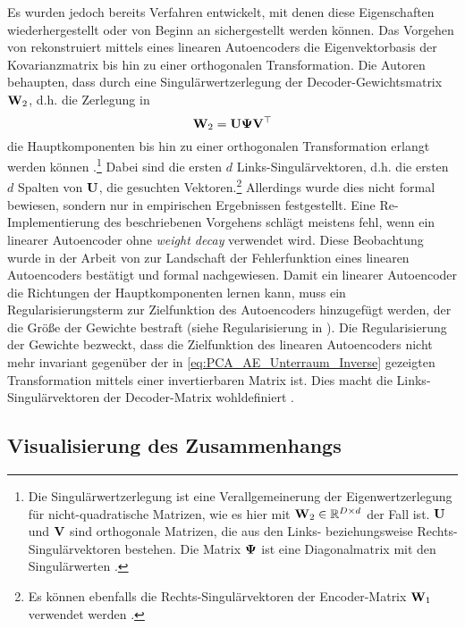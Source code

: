 Es wurden jedoch bereits Verfahren entwickelt, mit denen diese Eigenschaften wiederhergestellt oder
von Beginn an sichergestellt werden können. Das Vorgehen von \textcite{Plaut.2018} rekonstruiert
mittels eines linearen Autoencoders die Eigenvektorbasis der Kovarianzmatrix bis hin zu einer
orthogonalen Transformation. Die Autoren behaupten, dass durch eine Singulärwertzerlegung der
Decoder-Gewichtsmatrix $\mathbf{W}_2$, d.h. die Zerlegung in
\begin{equation}
	\label{eq:SVD}
	\mathbf{W}_2 = \mathbf{U} \mathbf{\Psi} \mathbf{V}^\top
\end{equation}
die Hauptkomponenten bis hin zu einer orthogonalen Transformation erlangt werden können \parencite[4]{Plaut.2018}.\footnote{Die Singulärwertzerlegung ist eine Verallgemeinerung der
	Eigenwertzerlegung für nicht-quadratische Matrizen, wie es hier mit $\mathbf{W}_2 \in \mathbb{R}^{D \times
			d}$ der Fall ist. $\mathbf{U}$ und $\mathbf{V}$ sind orthogonale Matrizen, die aus den Links-
	beziehungsweise Rechts-Singulärvektoren bestehen. Die Matrix $\mathbf{\Psi}$ ist eine Diagonalmatrix
	mit den Singulärwerten \parencite[44 -- 45]{Goodfellow.2016}. } Dabei sind die ersten $d$ Links-Singulärvektoren, d.h. die
ersten $d$ Spalten von $\mathbf{U}$, die gesuchten Vektoren.\footnote{Es können ebenfalls die
	Rechts-Singulärvektoren der Encoder-Matrix $\mathbf{W}_1$ verwendet werden \parencite[4]{Plaut.2018}.} Allerdings wurde dies nicht formal bewiesen, sondern nur in empirischen
Ergebnissen festgestellt. Eine Re-Implementierung des beschriebenen Vorgehens schlägt meistens
fehl, wenn ein linearer Autoencoder ohne \textit{weight decay} verwendet wird. Diese Beobachtung
wurde in der Arbeit von \textcite{Kunin.2019} zur Landschaft der Fehlerfunktion eines linearen
Autoencoders bestätigt und formal nachgewiesen. Damit ein linearer Autoencoder die Richtungen der
Hauptkomponenten lernen kann, muss ein Regularisierungsterm zur Zielfunktion des Autoencoders
hinzugefügt werden, der die Größe der Gewichte bestraft (siehe Regularisierung in
). Die Regularisierung der Gewichte bezweckt, dass die
Zielfunktion des linearen Autoencoders nicht mehr invariant gegenüber der in
\eqref{eq:PCA_AE_Unterraum_Inverse} gezeigten Transformation mittels einer invertierbaren Matrix
ist. Dies macht die Links-Singulärvektoren der Decoder-Matrix wohldefiniert \parencite[3]{Kunin.2019}.

\subsection{Visualisierung des Zusammenhangs}

